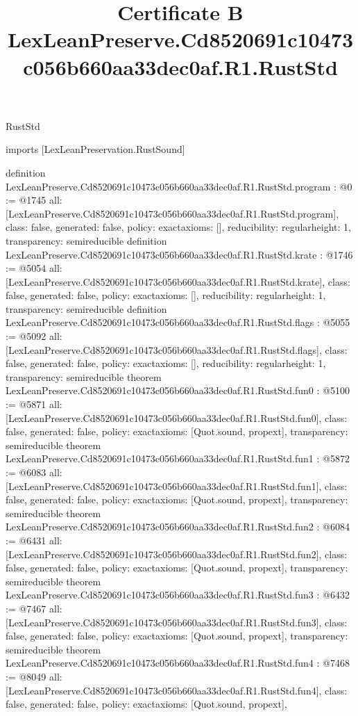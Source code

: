 \begin{lexlean}{RustStd}
\title{Certificate B LexLeanPreserve.Cd8520691c10473c056b660aa33dec0af.R1.RustStd}
\begin{coremodule}
imports [LexLeanPreservation.RustSound]

definition LexLeanPreserve.Cd8520691c10473c056b660aa33dec0af.R1.RustStd.program : @0 := @1745 {
  all: [LexLeanPreserve.Cd8520691c10473c056b660aa33dec0af.R1.RustStd.program],
  class: false,
  generated: false,
  policy: exact{axioms: []},
  reducibility: regular{height: 1},
  transparency: semireducible
}
definition LexLeanPreserve.Cd8520691c10473c056b660aa33dec0af.R1.RustStd.krate : @1746 := @5054 {
  all: [LexLeanPreserve.Cd8520691c10473c056b660aa33dec0af.R1.RustStd.krate],
  class: false,
  generated: false,
  policy: exact{axioms: []},
  reducibility: regular{height: 1},
  transparency: semireducible
}
definition LexLeanPreserve.Cd8520691c10473c056b660aa33dec0af.R1.RustStd.flags : @5055 := @5092 {
  all: [LexLeanPreserve.Cd8520691c10473c056b660aa33dec0af.R1.RustStd.flags],
  class: false,
  generated: false,
  policy: exact{axioms: []},
  reducibility: regular{height: 1},
  transparency: semireducible
}
theorem LexLeanPreserve.Cd8520691c10473c056b660aa33dec0af.R1.RustStd.fun0 : @5100 := @5871 {
  all: [LexLeanPreserve.Cd8520691c10473c056b660aa33dec0af.R1.RustStd.fun0],
  class: false,
  generated: false,
  policy: exact{axioms: [Quot.sound, propext]},
  transparency: semireducible
}
theorem LexLeanPreserve.Cd8520691c10473c056b660aa33dec0af.R1.RustStd.fun1 : @5872 := @6083 {
  all: [LexLeanPreserve.Cd8520691c10473c056b660aa33dec0af.R1.RustStd.fun1],
  class: false,
  generated: false,
  policy: exact{axioms: [Quot.sound, propext]},
  transparency: semireducible
}
theorem LexLeanPreserve.Cd8520691c10473c056b660aa33dec0af.R1.RustStd.fun2 : @6084 := @6431 {
  all: [LexLeanPreserve.Cd8520691c10473c056b660aa33dec0af.R1.RustStd.fun2],
  class: false,
  generated: false,
  policy: exact{axioms: [Quot.sound, propext]},
  transparency: semireducible
}
theorem LexLeanPreserve.Cd8520691c10473c056b660aa33dec0af.R1.RustStd.fun3 : @6432 := @7467 {
  all: [LexLeanPreserve.Cd8520691c10473c056b660aa33dec0af.R1.RustStd.fun3],
  class: false,
  generated: false,
  policy: exact{axioms: [Quot.sound, propext]},
  transparency: semireducible
}
theorem LexLeanPreserve.Cd8520691c10473c056b660aa33dec0af.R1.RustStd.fun4 : @7468 := @8049 {
  all: [LexLeanPreserve.Cd8520691c10473c056b660aa33dec0af.R1.RustStd.fun4],
  class: false,
  generated: false,
  policy: exact{axioms: [Quot.sound, propext]},
}
\end{coremodule}
\end{lexlean}
